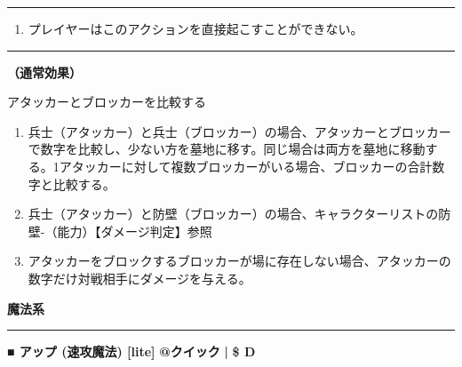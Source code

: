 \documentclass[twocolumn,a5paper,papersize,10pt]{jarticle}
\begin{document}
\vspace{1mm}%
\hrule height 0.1mm depth 0mm width 66.5mm %
\vspace{1mm}%


\vspace{-1zh}%
\begin{enumerate}
\renewcommand{\labelenumi}{※}
\setlength{\leftskip}{-0.3cm}
\setlength{\itemsep}{0pt} %
\setlength{\parskip}{0pt} %

\item プレイヤーはこのアクションを直接起こすことができない。

\vspace{-3mm}%
\end{enumerate}
\vspace{1mm}%
\hrule height 0.1mm depth 0mm width 66.5mm %
\vspace{1mm}%

{\bf（通常効果）}

アタッカーとブロッカーを比較する


\vspace{-1zh}%
\begin{enumerate}
\setlength{\leftskip}{-0.3cm}
\setlength{\parskip}{0pt} %

\item 兵士（アタッカー）と兵士（ブロッカー）の場合、アタッカーとブロッカーで数字を比較し、少ない方を墓地に移す。同じ場合は両方を墓地に移動する。1アタッカーに対して複数ブロッカーがいる場合、ブロッカーの合計数字と比較する。

\item 兵士（アタッカー）と防壁（ブロッカー）の場合、キャラクターリストの防壁-（能力）【ダメージ判定】参照

\item アタッカーをブロックするブロッカーが場に存在しない場合、アタッカーの数字だけ対戦相手にダメージを与える。
\vspace{-1zh}%
\end{enumerate}


\begin{tcolorbox}
{\scriptsize\bf 魔法系}
\end{tcolorbox}
\vspace{-1zh}%
\vspace{2mm} %
\hrule height 0.5mm depth 0mm width 66.5mm %
\vspace{1mm} %
{\small\bf ■ アップ {\scriptsize (速攻魔法) [lite]}} %
\hfill 
{\footnotesize\bf @クイック }
  {\footnotesize\bf | } {\footnotesize\bf \$ D}
\end{document}
